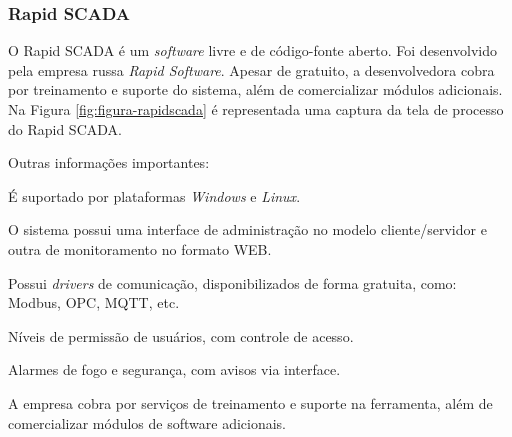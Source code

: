 \subsubsection{Rapid SCADA}
\label{sec:rapidscada}


    O Rapid SCADA \cite{RapidSCADA} é um \textit{software} livre e de código-fonte aberto. Foi desenvolvido pela empresa russa \textit{Rapid Software}. Apesar de gratuito, a desenvolvedora cobra por treinamento e suporte do sistema, além de comercializar módulos adicionais. Na Figura \ref{fig:figura-rapidscada} é representada uma captura da tela de processo do Rapid SCADA.

    \begin{figure}[!h]
    \end{figure}
    
    Outras informações importantes:
    
    \begin{alineascomponto}
        \item É suportado por plataformas \textit{Windows} e \textit{Linux}.
	    \item O sistema possui uma interface de administração no modelo cliente/servidor e outra de monitoramento no formato \gls{WEB}.
	    \item Possui \textit{drivers} de comunicação, disponibilizados de forma gratuita, como: Modbus, \gls{OPC}, \gls{MQTT}, etc.
	    \item Níveis de permissão de usuários, com controle de acesso.
	    \item Alarmes de fogo e segurança, com avisos via interface.
	    \item A empresa cobra por serviços de treinamento e suporte na ferramenta, além de comercializar módulos de software adicionais.
    \end{alineascomponto}
    
